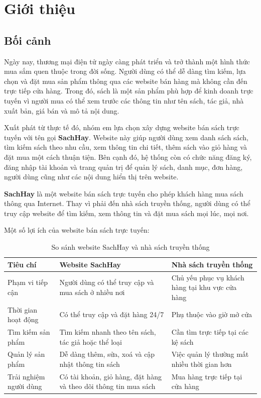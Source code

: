 
\section{Giới thiệu}

\subsection{Bối cảnh}

Ngày nay, thương mại điện tử ngày càng phát triển và trở thành một hình thức mua sắm quen thuộc trong đời sống. Người dùng có thể dễ dàng tìm kiếm, lựa chọn và đặt mua sản phẩm thông qua các website bán hàng mà không cần đến trực tiếp cửa hàng. Trong đó, sách là một sản phẩm phù hợp để kinh doanh trực tuyến vì người mua có thể xem trước các thông tin như tên sách, tác giả, nhà xuất bản, giá bán và mô tả nội dung.

Xuất phát từ thực tế đó, nhóm em lựa chọn xây dựng website bán sách trực tuyến với tên gọi \textbf{SachHay}. Website này giúp người dùng xem danh sách sách, tìm kiếm sách theo nhu cầu, xem thông tin chi tiết, thêm sách vào giỏ hàng và đặt mua một cách thuận tiện. Bên cạnh đó, hệ thống còn có chức năng đăng ký, đăng nhập tài khoản và trang quản trị để quản lý sách, danh mục, đơn hàng, người dùng cũng như các nội dung hiển thị trên website.

\textbf{SachHay} là một website bán sách trực tuyến cho phép khách hàng mua sách thông qua Internet. Thay vì phải đến nhà sách truyền thống, người dùng có thể truy cập website để tìm kiếm, xem thông tin và đặt mua sách mọi lúc, mọi nơi.

Một số lợi ích của website bán sách trực tuyến:

\begin{table}[H]
	\centering
	\begin{tabular}{|p{4cm}|p{5cm}|p{5cm}|}
		\hline
		\textbf{Tiêu chí} & \textbf{Website SachHay} & \textbf{Nhà sách truyền thống} \\
		\hline
		Phạm vi tiếp cận & Người dùng có thể truy cập và mua sách ở nhiều nơi & Chủ yếu phục vụ khách hàng tại khu vực cửa hàng \\
		\hline
		Thời gian hoạt động & Có thể truy cập và đặt hàng 24/7 & Phụ thuộc vào giờ mở cửa \\
		\hline
		Tìm kiếm sản phẩm & Tìm kiếm nhanh theo tên sách, tác giả hoặc thể loại & Cần tìm trực tiếp tại các kệ sách \\
		\hline
		Quản lý sản phẩm & Dễ dàng thêm, sửa, xoá và cập nhật thông tin sách & Việc quản lý thường mất nhiều thời gian hơn \\
		\hline
		Trải nghiệm người dùng & Có tài khoản, giỏ hàng, đặt hàng và theo dõi thông tin mua sách & Mua hàng trực tiếp tại cửa hàng \\
		\hline
	\end{tabular}
	\caption{So sánh website SachHay và nhà sách truyền thống}
	\label{tab:sachhay-comparison}
\end{table}


